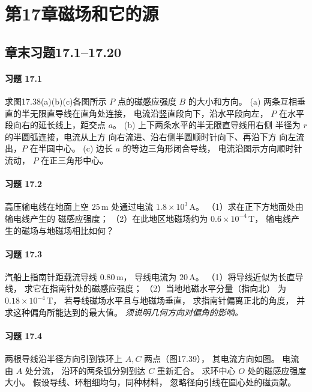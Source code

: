 \section*{第17章\quad 磁场和它的源}
\subsection*{章末习题17.1--17.20}

\paragraph{习题 17.1}
求图17.38(a)(b)(c)各图所示
\(P\) 点的磁感应强度 \(B\) 的大小和方向。
(a) 两条互相垂直的半无限直导线在直角处连接，
电流沿竖直段向下，沿水平段向左，
\(P\) 在水平段向右的延长线上，距交点 \(a\)。
(b) 上下两条水平的半无限直导线用右侧
半径为 \(r\) 的半圆弧连接，电流从上方
向右流进、沿右侧半圆顺时针向下、再沿下方
向左流出，\(P\) 在半圆中心。
(c) 边长 \(a\) 的等边三角形闭合导线，
电流沿图示方向顺时针流动，
\(P\) 在正三角形中心。

\paragraph{习题 17.2}
高压输电线在地面上空
\(25\,\mathrm m\) 处通过电流
\(1.8\times10^3\,\mathrm A\)。
（1）求在正下方地面处由输电线产生的
磁感应强度；
（2）在此地区地磁场约为
\(0.6\times10^{-4}\,\mathrm T\)，
输电线产生的磁场与地磁场相比如何？

\paragraph{习题 17.3}
汽船上指南针距载流导线
\(0.80\,\mathrm m\)，
导线电流为 \(20\,\mathrm A\)。
（1）将导线近似为长直导线，
求它在指南针处的磁感应强度；
（2）当地地磁水平分量（指向北）
为 \(0.18\times10^{-4}\,\mathrm T\)，
若导线磁场水平且与地磁场垂直，
求指南针偏离正北的角度，
并求这种偏角所能达到的最大值。
\textit{须说明几何方向对偏角的影响。}

\paragraph{习题 17.4}
两根导线沿半径方向引到铁环上
\(A,C\) 两点（图17.39），
其电流方向如图。
电流由 \(A\) 处分流，
沿环的两条弧分别到达 \(C\) 重新汇合。
求环中心 \(O\) 处的磁感应强度大小。
假设导线、环粗细均匀，同种材料，
忽略径向引线在圆心处的磁贡献。

